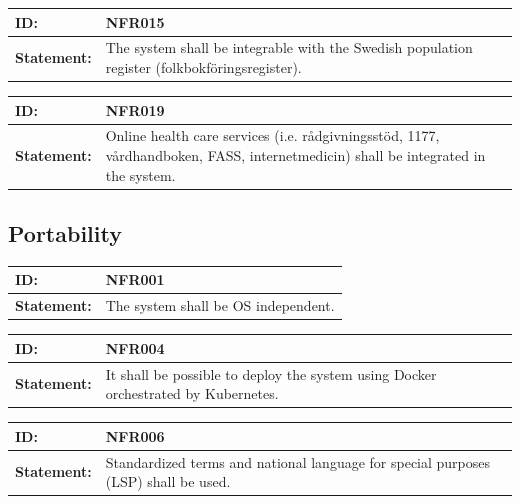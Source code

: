 \documentclass{scrreprt}
\begin{document}
\begin{center}
\begin{tabularx}{\linewidth}{| l | X |}
 \hline
 \textbf{ID:} & NFR015  \\ 
 \hline
 \textbf{Statement:} & The system shall be integrable with the Swedish population register (folkbokföringsregister). 
 \\ 
 \hline
\end{tabularx}
\end{center}

\begin{center}
\begin{tabularx}{\linewidth}{| l | X |}
 \hline
 \textbf{ID:} & NFR019  \\ 
 \hline
 \textbf{Statement:} & Online health care services (i.e. rådgivningsstöd, 1177, vårdhandboken, FASS, internetmedicin) shall be integrated in the system.
 \\ 
 \hline
\end{tabularx}
\end{center}

\subsection{Portability}

\begin{center}
\begin{tabularx}{\linewidth}{| l | X |}
 \hline
 \textbf{ID:} & NFR001  \\ 
 \hline
 \textbf{Statement:} & The system shall be OS independent.
 \\ 
 \hline
\end{tabularx}
\end{center}

\begin{center}
\begin{tabularx}{\linewidth}{| l | X |}
 \hline
 \textbf{ID:} & NFR004  \\ 
 \hline
 \textbf{Statement:} & It shall be possible to deploy the system using Docker orchestrated by Kubernetes.
 \\ 
 \hline
\end{tabularx}
\end{center}

\begin{center}
\begin{tabularx}{\linewidth}{| l | X |}
 \hline
 \textbf{ID:} & NFR006  \\ 
 \hline
 \textbf{Statement:} & Standardized terms and national language for special purposes (LSP) shall be used. 
 \\ 
 \hline
\end{tabularx}
\end{center}
\end{document}
